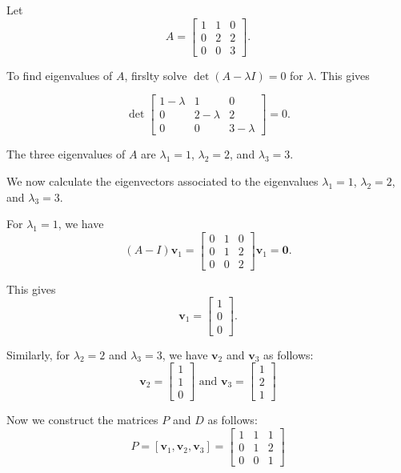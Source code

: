 \begin{example}
Let
\[
A = \begin{bmatrix} 1 & 1 & 0 \\ 0 & 2 & 2 \\ 0 & 0 & 3 \end{bmatrix}.
\]

To find eigenvalues of $A$, firslty solve \(\operatorname{det}(A - \lambda I) = 0\) for \(\lambda\). This gives

\[
\operatorname{det}\begin{bmatrix} 1 - \lambda & 1 & 0 \\ 0 & 2 - \lambda & 2 \\ 0 & 0 & 3 - \lambda \end{bmatrix} = 0.
\]

The three eigenvalues of $A$ are \(\lambda_1 = 1\), \(\lambda_2 = 2\), and \(\lambda_3 = 3\).

We now calculate the eigenvectors associated to the eigenvalues \(\lambda_1 = 1\), \(\lambda_2 = 2\), and \(\lambda_3 = 3\).

For \(\lambda_1 = 1\), we have
\[
(A - I)\mathbf{v}_1 = \begin{bmatrix} 0 & 1 & 0 \\ 0 & 1 & 2 \\ 0 & 0 & 2 \end{bmatrix} \mathbf{v}_1 = \mathbf{0}.
\]

This gives 
\[
\mathbf{v}_1 = \begin{bmatrix} 1 \\ 0 \\ 0 \end{bmatrix}.
\]

Similarly, for \(\lambda_2 = 2\) and \(\lambda_3 = 3\), we have \(\mathbf{v}_2\) and \(\mathbf{v}_3\) as follows:
\[
\mathbf{v}_2 = \begin{bmatrix} 1 \\ 1 \\ 0 \end{bmatrix} \text{ and }
\mathbf{v}_3 = \begin{bmatrix} 1 \\ 2 \\ 1 \end{bmatrix}
\]

 Now we construct the matrices \(P\) and \(D\) as follows:
\[
P = [\mathbf{v}_1, \mathbf{v}_2, \mathbf{v}_3] = \begin{bmatrix} 1 & 1 & 1 \\ 0 & 1 & 2 \\ 0 & 0 & 1 \end{bmatrix}
\]
 

\end{example}
